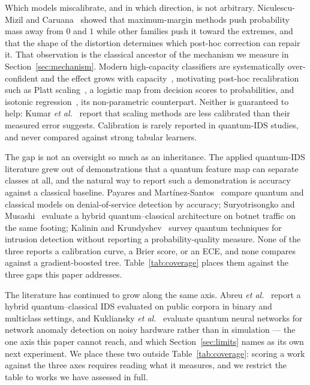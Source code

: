 \documentclass[journal]{IEEEtran}
\begin{document}
Which models miscalibrate, and in which direction, is not arbitrary.
Niculescu-Mizil and Caruana~\cite{niculescu2005predicting} showed that
maximum-margin methods push probability mass away from $0$ and $1$ while
other families push it toward the extremes, and that the shape of the
distortion determines which post-hoc correction can repair it. That
observation is the classical ancestor of the mechanism we measure in
Section~\ref{sec:mechanism}. Modern high-capacity classifiers are
systematically over-confident and the effect grows with
capacity~\cite{guo2017calibration}, motivating post-hoc recalibration such
as Platt scaling~\cite{platt1999svm}, a logistic map from decision scores
to probabilities, and isotonic regression~\cite{zadrozny2002transforming},
its non-parametric counterpart. Neither is guaranteed to help:
Kumar \emph{et al.}~\cite{kumar2019verified} report that scaling methods
are less calibrated than their measured error suggests. Calibration is
rarely reported in quantum-IDS studies, and never compared against strong
tabular learners.

The gap is not an oversight so much as an inheritance. The applied
quantum-IDS literature grew out of demonstrations that a quantum feature map
can separate classes at all, and the natural way to report such a
demonstration is accuracy against a classical baseline. Payares and
Mart\'{i}nez-Santos~\cite{payares2021dos} compare quantum and classical
models on denial-of-service detection by accuracy; Suryotrisongko and
Musashi~\cite{suryotrisongko2022dga} evaluate a hybrid
quantum--classical architecture on botnet traffic on the same footing;
Kalinin and Krundyshev~\cite{kalinin2023qids} survey quantum techniques for
intrusion detection without reporting a probability-quality measure. None
of the three reports a calibration curve, a Brier score, or an ECE, and
none compares against a gradient-boosted tree. Table~\ref{tab:coverage}
places them against the three gaps this paper addresses.

The literature has continued to grow along the same axis. Abreu \emph{et
al.}~\cite{abreu2024qmlids} report a hybrid quantum--classical IDS
evaluated on public corpora in binary and multiclass settings, and
Kukliansky \emph{et al.}~\cite{kukliansky2024qnn} evaluate quantum neural
networks for network anomaly detection on noisy hardware rather than in
simulation --- the one axis this paper cannot reach, and which
Section~\ref{sec:limits} names as its own next experiment. We place these
two outside Table~\ref{tab:coverage}: scoring a work against the three
axes requires reading what it measures, and we restrict the table to works
we have assessed in full.
\end{document}
